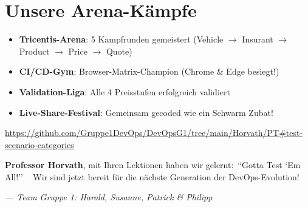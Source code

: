 \section{Unsere Arena-Kämpfe}
\begin{itemize}[leftmargin=*]
\item \textcolor{pokemonred}{\textbf{Tricentis-Arena}}: 5 Kampfrunden gemeistert (Vehicle $\rightarrow$ Insurant $\rightarrow$ Product $\rightarrow$ Price $\rightarrow$ Quote)
\item \textcolor{pokemonblue}{\textbf{CI/CD-Gym}}: Browser-Matrix-Champion (Chrome \& Edge besiegt!)
\item \textcolor{pokemonyellow}{\textbf{Validation-Liga}}: Alle 4 Preisstufen erfolgreich validiert
\item \textcolor{pokemongreen}{\textbf{Live-Share-Festival}}: Gemeinsam gecoded wie ein Schwarm Zubat!
\end{itemize}
\begin{tcolorbox}[colback=pokemonblue!10, colframe=pokemonblue!50, title=Unser Pokédex]
\url{https://github.com/Gruppe1DevOps/DevOpsG1/tree/main/Horvath/PT#test-scenario-categories}
\end{tcolorbox}
\begin{center}
\textbf{Professor Horvath}, mit Ihren Lektionen haben wir gelernt:\
\textcolor{pokemonred}{\Large ``Gotta Test `Em All!''} \
\vspace{0.5cm}
Wir sind jetzt bereit für die nächste Generation der DevOps-Evolution!
\end{center}
\vfill
\begin{flushright}
\textit{--- Team Gruppe 1: Harald, Susanne, Patrick \& Philipp}
\end{flushright}